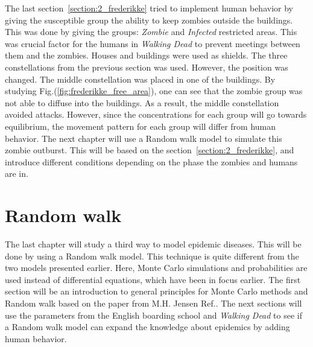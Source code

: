 \documentclass[%
twoside,                 %
final,                   %
chapterprefix=true,      %
open=right               %
10pt]{book}
\begin{document}
\vspace{3mm}




\vspace{3mm}


The last section~\ref{section:2_frederikke} tried to implement human behavior by giving the susceptible group the ability to keep zombies outside the buildings. This was done by giving the groups: \emph{Zombie} and \emph{Infected} restricted areas. This was crucial factor for the humans in \emph{Walking Dead} to prevent meetings between them and the zombies. Houses and buildings were used as shields. The three constellations from the previous section was used. However, the position was changed. The middle constellation was placed in one of the buildings. By studying Fig.(\ref{fig:frederikke_free_area}), one can see that the zombie group was not able to diffuse into the buildings. As a result, the middle constellation avoided attacks. However, since the concentrations for each group will go towards equilibrium, the movement pattern for each group will differ from human behavior. The next chapter will use a Random walk model to simulate this zombie outburst. This will be based on the section~\ref{section:2_frederikke}, and introduce different conditions depending on the phase the zombies and humans are in. 



\chapter{Random walk}
\label{section:Random_walk}
The last chapter will study a third way to model epidemic diseases. This will be done by using a Random walk model. This technique is quite different from the two models presented earlier. Here, Monte Carlo simulations and probabilities are used instead of differential equations, which have been in focus earlier. The first section will be an introduction to general principles for Monte Carlo methods and Random walk based on the paper from M.H. Jensen Ref.\cite{hjorth2011computational}. The next sections will use the parameters from the English boarding school and \emph{Walking Dead} to see if a Random walk model can expand the knowledge about epidemics by adding human behavior. 
\end{document}
